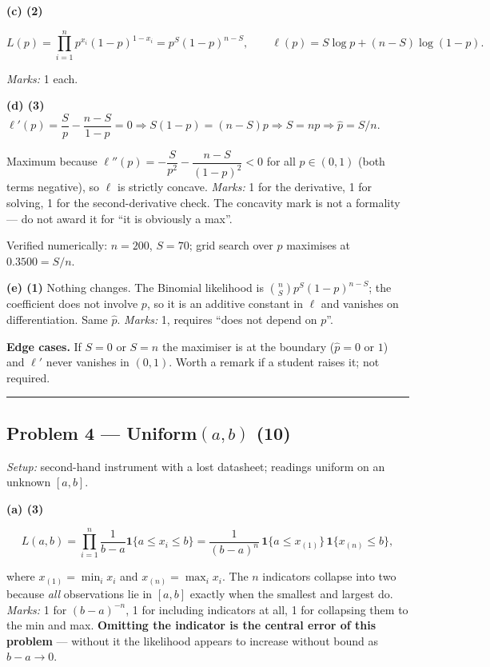 \documentclass[
  11pt,
  a4paper,
]{article}
\begin{document}
\textbf{(c) (2)}

\[
L(p) = \prod_{i=1}^n p^{x_i}(1-p)^{1-x_i} = p^{S}(1-p)^{n-S},
\qquad
\ell(p) = S\log p + (n-S)\log(1-p).
\]

\emph{Marks:} 1 each.

\textbf{(d) (3)} \(\ell'(p) = \dfrac{S}{p} - \dfrac{n-S}{1-p} = 0
\Rightarrow S(1-p) = (n-S)p \Rightarrow S = np \Rightarrow \boxed{\hat p = S/n}\).

Maximum because
\(\ell''(p) = -\dfrac{S}{p^2} - \dfrac{n-S}{(1-p)^2} < 0\) for all
\(p \in (0,1)\) (both terms negative), so \(\ell\) is strictly concave.
\emph{Marks:} 1 for the derivative, 1 for solving, 1 for the
second-derivative check. The concavity mark is not a formality --- do
not award it for ``it is obviously a max''.

Verified numerically: \(n=200\), \(S=70\); grid search over \(p\)
maximises at \(0.3500 = S/n\).

\textbf{(e) (1)} Nothing changes. The Binomial likelihood is
\(\binom{n}{S}p^{S}(1-p)^{n-S}\); the coefficient does not involve
\(p\), so it is an additive constant in \(\ell\) and vanishes on
differentiation. Same \(\hat p\). \emph{Marks:} 1, requires ``does not
depend on \(p\)''.

\textbf{Edge cases.} If \(S = 0\) or \(S = n\) the maximiser is at the
boundary (\(\hat p = 0\) or \(1\)) and \(\ell'\) never vanishes in
\((0,1)\). Worth a remark if a student raises it; not required.

\begin{center}\rule{0.5\linewidth}{0.5pt}\end{center}

\subsection{\texorpdfstring{Problem 4 --- Uniform\((a,b)\)
(10)}{Problem 4 --- Uniform(a,b) (10)}}\label{problem-4-uniformab-10}

\emph{Setup:} second-hand instrument with a lost datasheet; readings
uniform on an unknown \([a,b]\).

\textbf{(a) (3)}

\[
L(a,b) = \prod_{i=1}^n \frac{1}{b-a}\mathbf{1}\{a \le x_i \le b\}
= \frac{1}{(b-a)^n}\,\mathbf{1}\{a \le x_{(1)}\}\,\mathbf{1}\{x_{(n)} \le b\},
\]

where \(x_{(1)} = \min_i x_i\) and \(x_{(n)} = \max_i x_i\). The \(n\)
indicators collapse into two because \emph{all} observations lie in
\([a,b]\) exactly when the smallest and largest do. \emph{Marks:} 1 for
\((b-a)^{-n}\), 1 for including indicators at all, 1 for collapsing them
to the min and max. \textbf{Omitting the indicator is the central error
of this problem} --- without it the likelihood appears to increase
without bound as \(b - a \to 0\).
\end{document}
